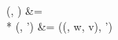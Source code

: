 \entries(\delta, \varepsilon) &{}= \delta \\*
\entries(\delta,  \cons \delta') &{}= \entries(\update(\delta, w, v), \delta')
